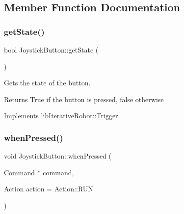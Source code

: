 \subsection{Member Function Documentation}
\mbox{\label{classlib_iterative_robot_1_1_joystick_button_ac17a3cda9edaf3a38bb87070c47191a1}} 
\subsubsection{\texorpdfstring{getState()}{getState()}}
{\footnotesize\ttfamily bool Joystick\+Button\+::get\+State (\begin{DoxyParamCaption}{ }\end{DoxyParamCaption})\hspace{0.3cm}{\ttfamily [virtual]}}



Gets the state of the button. 

\begin{DoxyReturn}{Returns}
True if the button is pressed, false otherwise 
\end{DoxyReturn}


Implements \mbox{\hyperlink{classlib_iterative_robot_1_1_trigger_a785ea056a56974f2965c71fd0520bb87}{lib\+Iterative\+Robot\+::\+Trigger}}.

\mbox{\label{classlib_iterative_robot_1_1_joystick_button_ad31d68d951ae4651731881a94515cbbe}} 
\subsubsection{\texorpdfstring{whenPressed()}{whenPressed()}}
{\footnotesize\ttfamily void Joystick\+Button\+::when\+Pressed (\begin{DoxyParamCaption}\item[{\mbox{\hyperlink{classlib_iterative_robot_1_1_command}{Command}} $\ast$}]{command,  }\item[{Action}]{action = {\ttfamily Action\+:\+:RUN} }\end{DoxyParamCaption})}



